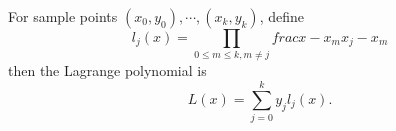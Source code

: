 For sample points $(x_0, y_0), \cdots, (x_k, y_k)$, define 
$$l_j(x) = \prod_{0 \leq m \leq k, m \neq j} frac{x - x_m}{x_j - x_m}$$
then the Lagrange polynomial is
$$L(x) = \sum_{j=0}^k y_j l_j(x). $$
